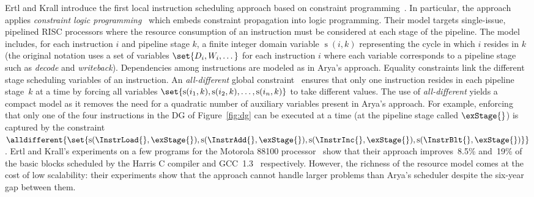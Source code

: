 \documentclass[acmsmall,authorversion,nonacm]{acmart}
\newcommand{\noMathVar}[2]{\operatorname{#1}(#2)}
\newcommand{\var}[2]{$\noMathVar{#1}{#2}$}
\begin{document}
Ertl and Krall introduce the first local instruction scheduling
approach based on constraint programming~\cite{Ertl1991}.
In particular, the approach applies \emph{constraint logic
  programming}~\cite{Jaffar1987} which embeds constraint propagation
into logic programming.
Their model targets single-issue, pipelined RISC processors where the
resource consumption of an instruction must be considered at each
stage of the pipeline.
The model includes, for each instruction $i$ and pipeline stage $k$, a
finite integer domain variable \var{s}{i,k} representing the cycle in
which $i$ resides in $k$ (the original notation uses a set of
variables $\set{D_i, W_i, \dots}$ for each instruction $i$ where each
variable corresponds to a pipeline stage such as \emph{decode} and
\emph{writeback}).
Dependencies among instructions are modeled as in Arya's approach.
Equality constraints link the different stage scheduling variables of
an instruction.
An \emph{all-different} global constraint~\cite{CPH:global} ensures
that only one instruction resides in each pipeline stage~$k$ at a time
by forcing all variables $\set{\noMathVar{s}{i_1,k},
  \noMathVar{s}{i_2,k}, \ldots, \noMathVar{s}{i_n,k}}$ to take
different values.
The use of \emph{all-different} yields a compact model as it removes
the need for a quadratic number of auxiliary variables present in
Arya's approach.
For example, enforcing that only one of the four instructions in the
DG of Figure~\ref{fig:dg} can be executed at a time (at the pipeline
stage called $\exStage{}$) is captured by the constraint
$\alldifferent{\set{\noMathVar{s}{\InstrLoad{},\exStage{}},
    \noMathVar{s}{\InstrAdd{},\exStage{}},
    \noMathVar{s}{\InstrInc{},\exStage{}},
    \noMathVar{s}{\InstrBlt{},\exStage{}}}}$.
Ertl and Krall's experiments on a few programs for the Motorola 88100
processor~\cite{Alsup1990} show that their approach improves~8.5\%
and~19\% of the basic blocks scheduled by the Harris C compiler and
GCC~1.3~\cite{GCC2017} respectively.
However, the richness of the resource model comes at the cost of low
scalability: their experiments show that the approach cannot handle
larger problems than Arya's scheduler despite the six-year gap between
them.
\end{document}
